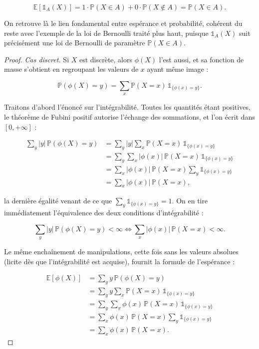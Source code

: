 $$
\mathbb{E}[\mathbb{1}_A(X)] = 1 \cdot \mathbb{P}(X \in A) + 0 \cdot \mathbb{P}(X \notin A) = \mathbb{P}(X \in A).
$$

On retrouve là le lien fondamental entre espérance et probabilité, cohérent du reste avec l'exemple de la loi de Bernoulli traité plus haut, puisque $\mathbb{1}_A(X)$ suit précisément une loi de Bernoulli de paramètre $\mathbb{P}(X \in A)$.

\begin{proof}
\textit{Cas discret.} Si $X$ est discrète, alors $\phi(X)$ l'est aussi, et sa fonction de masse s'obtient en regroupant les valeurs de $x$ ayant même image :

$$
\mathbb{P}(\phi(X) = y) = \sum_x \mathbb{P}(X = x)\, \mathbb{1}_{\{\phi(x) = y\}}.
$$

Traitons d'abord l'énoncé sur l'intégrabilité. Toutes les quantités étant positives, le théorème de Fubini positif autorise l'échange des sommations, et l'on écrit dans $[0, +\infty]$ :

\begin{align*}
\sum_y |y|\, \mathbb{P}(\phi(X) = y) &= \sum_y |y| \sum_x \mathbb{P}(X = x)\, \mathbb{1}_{\{\phi(x) = y\}} \\
&= \sum_y \sum_x |\phi(x)|\, \mathbb{P}(X = x)\, \mathbb{1}_{\{\phi(x) = y\}} \\
&= \sum_x |\phi(x)|\, \mathbb{P}(X = x) \sum_y \mathbb{1}_{\{\phi(x) = y\}} \\
&= \sum_x |\phi(x)|\, \mathbb{P}(X = x),
\end{align*}

la dernière égalité venant de ce que $\sum_y \mathbb{1}_{\{\phi(x) = y\}} = 1$. On en tire immédiatement l'équivalence des deux conditions d'intégrabilité :

$$
\sum_y |y|\, \mathbb{P}(\phi(X) = y) < \infty \iff \sum_x |\phi(x)|\, \mathbb{P}(X = x) < \infty.
$$

Le même enchaînement de manipulations, cette fois sans les valeurs absolues (licite dès que l'intégrabilité est acquise), fournit la formule de l'espérance :

\begin{align*}
\mathbb{E}[\phi(X)] &= \sum_y y\, \mathbb{P}(\phi(X) = y) \\
&= \sum_y y \sum_x \mathbb{P}(X = x)\, \mathbb{1}_{\{\phi(x) = y\}} \\
&= \sum_y \sum_x \phi(x)\, \mathbb{P}(X = x)\, \mathbb{1}_{\{\phi(x) = y\}} \\
&= \sum_x \phi(x)\, \mathbb{P}(X = x) \sum_y \mathbb{1}_{\{\phi(x) = y\}} \\
&= \sum_x \phi(x)\, \mathbb{P}(X = x).
\end{align*}


\end{proof}

